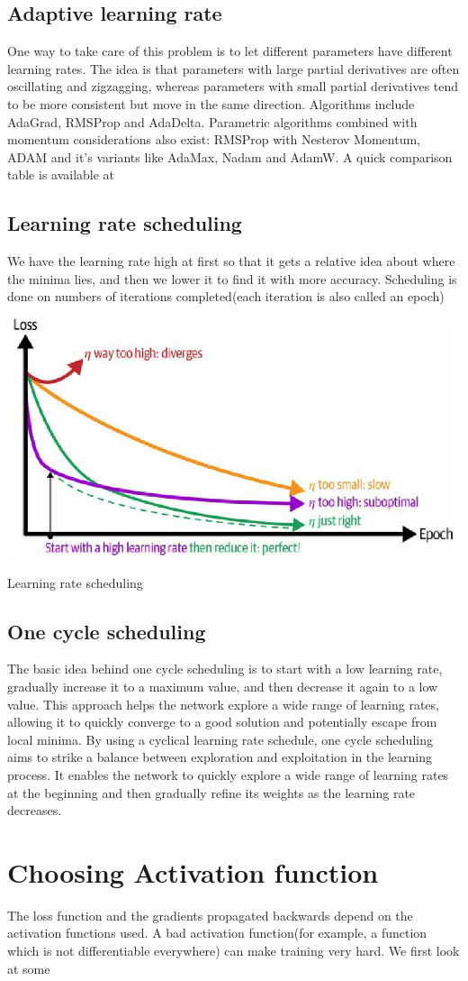 \subsection{Adaptive learning rate}
One way to take care of this problem is  to let different parameters have different learning rates. The idea is that parameters with large partial derivatives are often oscillating
and zigzagging, whereas parameters with small partial derivatives tend to be
more consistent but move in the same direction.
Algorithms include AdaGrad, RMSProp and AdaDelta. Parametric algorithms
combined with momentum considerations also exist: RMSProp with Nesterov
Momentum, ADAM and it's variants like AdaMax, Nadam and AdamW. A quick
comparison table is available at \citep{geron2022hands}
\subsection{Learning rate scheduling}
We have the learning rate high at first so
that it gets a relative idea about where the
minima lies, and then we lower it to find it
with more accuracy. Scheduling is done on numbers of iterations
completed(each iteration is also called an
epoch)
\begin{marginfigure}
    \includegraphics[width=1.3\textwidth]{graphics/learning rate schedule.png}\caption{Learning rate scheduling\citep{geron2022hands}}
\end{marginfigure}
\subsection{One cycle scheduling}
The basic idea behind one cycle scheduling is to start with a low learning
rate, gradually increase it to a maximum value, and then decrease it again to
a low value. This approach helps the network explore a wide range of
learning rates, allowing it to quickly converge to a good solution and
potentially escape from local minima. By using a cyclical learning rate schedule, one cycle scheduling aims to strike
a balance between exploration and exploitation in the learning process. It
enables the network to quickly explore a wide range of learning rates at the
beginning and then gradually refine its weights as the learning rate
decreases.
\section{Choosing Activation function}
The loss function and the gradients propagated backwards depend on the activation functions used. A bad activation function(for example, a function which is not differentiable everywhere) can make training very hard. We first look at some 